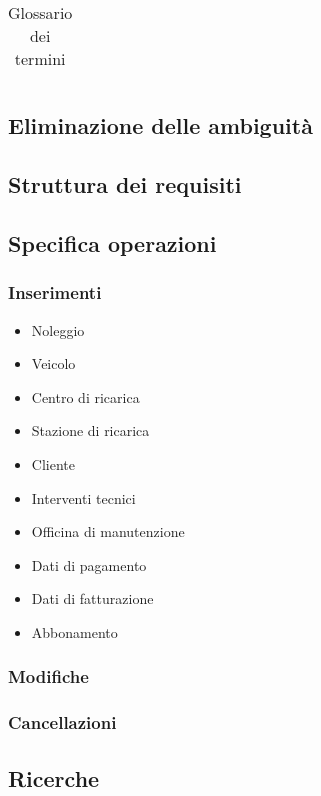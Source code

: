 \documentclass{article}
\begin{document}
\begin{table}
\begin{tabularx}{\textwidth}{|X|X|X|X|}
\end{tabularx}
\caption{Glossario dei termini}
\label{table_glossario_termini}
\end{table}

\subsection{Eliminazione delle ambiguità}

\subsection{Struttura dei requisiti}

\subsection{Specifica operazioni}

\subsubsection{Inserimenti}
\begin{itemize}
    \item Noleggio
    \item Veicolo
    \item Centro di ricarica
    \item Stazione di ricarica
    \item Cliente
    \item Interventi tecnici
    \item Officina di manutenzione
    \item Dati di pagamento
    \item Dati di fatturazione
    \item Abbonamento
\end{itemize}

\subsubsection{Modifiche}

\subsubsection{Cancellazioni}

\subsection{Ricerche}
\end{document}
